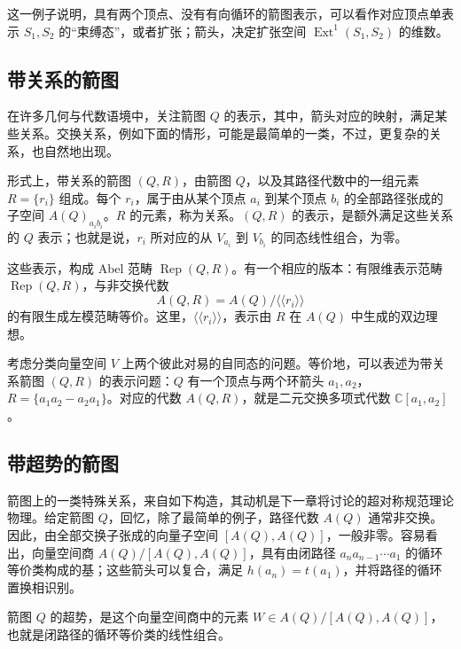 这一例子说明，具有两个顶点、没有有向循环的箭图表示，可以看作对应顶点单表示 $S_1,S_2$ 的“束缚态”，或者扩张；箭头，决定扩张空间 $\operatorname{Ext}^1(S_1,S_2)$ 的维数。

\subsection{带关系的箭图}\label{sec:4.2.4}

在许多几何与代数语境中，关注箭图 $Q$ 的表示，其中，箭头对应的映射，满足某些关系。交换关系，例如下面的情形，可能是最简单的一类，不过，更复杂的关系，也自然地出现。

\begin{definition*}\label{def:4.quiver-with-relations}
形式上，带关系的箭图 $(Q,R)$，由箭图 $Q$，以及其路径代数中的一组元素 $R=\{r_i\}$ 组成。每个 $r_i$，属于由从某个顶点 $a_i$ 到某个顶点 $b_i$ 的全部路径张成的子空间 $A(Q)_{a_ib_i}$。$R$ 的元素，称为关系。$(Q,R)$ 的表示，是额外满足这些关系的 $Q$ 表示；也就是说，$r_i$ 所对应的从 $V_{a_i}$ 到 $V_{b_i}$ 的同态线性组合，为零。
\end{definition*}
这些表示，构成 Abel 范畴 $\operatorname{Rep}(Q,R)$。有一个相应的版本：有限维表示范畴 $\operatorname{Rep}(Q,R)$，与非交换代数
\[
A(Q,R)=A(Q)/\langle\!\langle r_i\rangle\!\rangle
\]
的有限生成左模范畴等价。这里，$\langle\!\langle r_i\rangle\!\rangle$，表示由 $R$ 在 $A(Q)$ 中生成的双边理想。

\begin{example}\label{ex:4.32}
考虑分类向量空间 $V$ 上两个彼此对易的自同态的问题。等价地，可以表述为带关系箭图 $(Q,R)$ 的表示问题：$Q$ 有一个顶点与两个环箭头 $a_1,a_2$，$R=\{a_1a_2-a_2a_1\}$。对应的代数 $A(Q,R)$，就是二元交换多项式代数 $\mathbb{C}[a_1,a_2]$。
\end{example}

\subsection{带超势的箭图}\label{sec:4.2.5}

箭图上的一类特殊关系，来自如下构造，其动机是下一章将讨论的超对称规范理论物理。给定箭图 $Q$，回忆，除了最简单的例子，路径代数 $A(Q)$ 通常非交换。因此，由全部交换子张成的向量子空间 $[A(Q),A(Q)]$，一般非零。容易看出，向量空间商 $A(Q)/[A(Q),A(Q)]$，具有由闭路径 $a_na_{n-1}\cdots a_1$ 的循环等价类构成的基；这些箭头可以复合，满足 $h(a_n)=t(a_1)$，并将路径的循环置换相识别。
\begin{definition*}\label{def:4.quiver-superpotential}
箭图 $Q$ 的超势，是这个向量空间商中的元素 $W\in A(Q)/[A(Q),A(Q)]$，也就是闭路径的循环等价类的线性组合。
\end{definition*}

